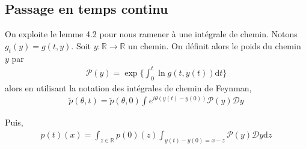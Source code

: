 \documentclass{article}
\newtheorem{theorem}{Théorème}[section]
\begin{document}
\subsection{Passage en temps continu}
On exploite le lemme 4.2 pour nous ramener à une intégrale de chemin. Notons $g_t(y) = g(t,y)$. Soit $y : \mathbb{R}\to \mathbb{R}$ un chemin. On définit alors le poids du chemin $y$ par \begin{align*}
	\mathcal{P}(y) = \exp\{\int_{0}^t \ln g(t, \dot{y}(t))\mathrm{d}t\}
\end{align*}
alors en utilisant la notation des intégrales de chemin de Feynman,
\begin{align*}
	\tilde{p}(\theta, t) = \tilde{p}(\theta, 0)\int e^{i\theta (y(t)-y(0))}\mathcal{P}(y)\mathcal{D}y
\end{align*}

Puis,
\begin{align*}
	p(t)(x) = \int_{z\in\mathbb{R}}p(0)(z)\int_{y(t)-y(0)=x-z} \mathcal{P}(y)\mathcal{D}y\mathrm{d}z
\end{align*}
%
\end{document}
